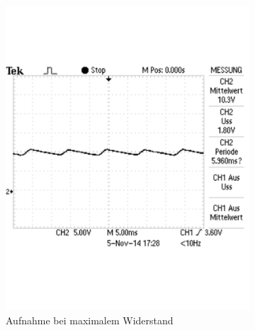 \documentclass[12pt,a4paper]{article}
\begin{document}
\begin{figure}[H]
        \centering
        \begin{subfigure}[b]{0.48\textwidth}
                \includegraphics[width=\textwidth , scale = 0.4]{2_6_100F_1.pdf}
                \caption[Aufnahme bei maximalem Widerstand]{Aufnahme bei maximalem Widerstand}
 				 \label{fig:2_6_100F_1}
        \end{subfigure}%
        \hfill
        \begin{subfigure}[b]{0.48\textwidth}

\end{subfigure}
\end{figure}
\end{document}
